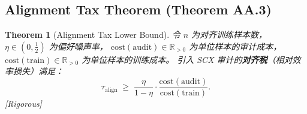 \documentclass[12pt,a4paper]{article}
\newtheorem{theorem}{Theorem}[section]
\newcommand{\rigorous}{\textcolor{green!50!black}{\small\textsf{[Rigorous]}}}
\newcommand{\R}{\mathbb{R}}
\begin{document}
\subsection{Alignment Tax Theorem (Theorem AA.3)}

\begin{theorem}[Alignment Tax Lower Bound]
\label{thm:align-tax}
令 $n$ 为对齐训练样本数，$\eta\in(0,\frac12)$ 为偏好噪声率，
$\mathrm{cost}(\mathrm{audit}) \in \R_{>0}$ 为单位样本的审计成本，
$\mathrm{cost}(\mathrm{train}) \in \R_{>0}$ 为单位样本的训练成本。
引入 SCX 审计的\textbf{对齐税}（相对效率损失）满足：
\begin{equation}\label{eq:tau-align}
\tau_{\mathrm{align}} \;\geq\;
\frac{\eta}{1-\eta}\cdot
\frac{\mathrm{cost}(\mathrm{audit})}{\mathrm{cost}(\mathrm{train})}.
\end{equation}
\rigorous
\end{theorem}
\end{document}
